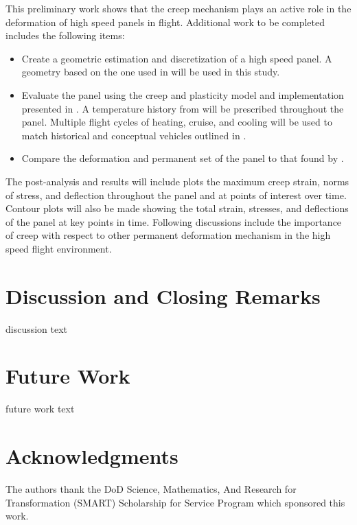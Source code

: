 \documentclass[conf]{new-aiaa}
\begin{document}
This preliminary work shows that the creep mechanism plays 
an active role in the deformation of high speed panels in flight.
Additional work to be completed includes the following items:

\begin{itemize}
  \item Create a geometric estimation and discretization of a high speed panel.
        A geometry based on the one used in 
        \cite{ culler_impact_of_FTS_coupling_on_response_prediction_hypersonic_skin_panels}
        will be used in this study.
  \item Evaluate the panel using the creep and plasticity model and implementation presented in
        \cite{ li_simulation_of_finite_strain_inelastic_phenomena_governed_by_creep_and_plasticity}.
        A temperature history from 
        \cite{ culler_impact_of_FTS_coupling_on_response_prediction_hypersonic_skin_panels}
        will be prescribed throughout the panel. 
        Multiple flight cycles of heating, cruise, and cooling will be used
        to match historical and conceptual vehicles outlined in
        \cite{ kordes_structureal_heating_experiencs_on_the_x15_airplane,
               zuchowski_AVIATR_Predictive_capability_for_hypersonic_structural_response_and_life_prediction_phase_II}.
  \item Compare the deformation and permanent set of the panel to that 
        found by \cite{ culler_impact_of_FTS_coupling_on_response_prediction_hypersonic_skin_panels}.
\end{itemize}

\noindent
The post-analysis and results will include plots the maximum creep strain, norms of stress, 
and deflection throughout the panel and at points of interest over time. 
Contour plots will also be made showing the total strain, stresses, and deflections
of the panel at key points in time.
Following discussions include the importance of creep 
with respect to other permanent deformation mechanism 
in the high speed flight environment.


\section{Discussion and Closing Remarks} \label{sec_closing_remarks}
discussion text

\section{Future Work} \label{sec_future}
future work text

\section*{Acknowledgments}
The authors thank the DoD Science, Mathematics, And 
Research for Transformation (SMART) Scholarship
for Service Program which sponsored this work.


\end{document}
